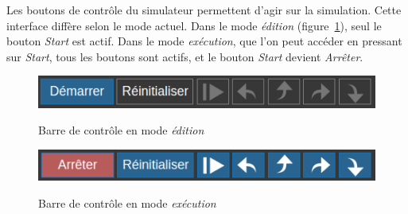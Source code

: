 \documentclass{tufte-handout}
\begin{document}
Les boutons de contrôle du simulateur permettent d'agir sur la simulation. 
Cette interface diffère selon le mode actuel. Dans le mode \emph{édition} (figure~\ref{f:controles1}), seul le bouton \textit{Start} est actif. Dans le mode \emph{exécution}, que l'on peut accéder en pressant sur \textit{Start}, tous les boutons sont actifs, et le bouton \textit{Start} devient \textit{Arrêter}. 
\begin{figure}[h!]
\raggedleft
\includegraphics[width=0.8\linewidth]{pics/controles_1b.png}
\label{f:controles1}
\caption{Barre de contrôle en mode \emph{édition}}
\end{figure}
\vspace{-1em}
\begin{figure}[h!]
\raggedleft
\includegraphics[width=0.8\linewidth]{pics/controles_2b.png}
\label{f:controles2}
\caption{Barre de contrôle en mode \emph{exécution}}
\end{figure}
\end{document}
